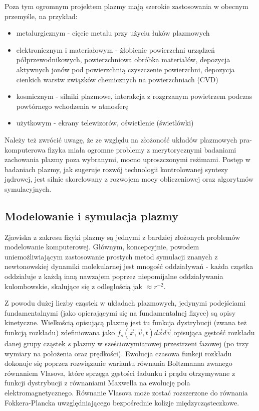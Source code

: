     Poza tym ogromnym projektem plazmy mają szerokie zastosowania w obecnym przemyśle, na przykład:
    \begin{itemize}
        \item metalurgicznym - cięcie metalu przy użyciu łuków plazmowych
        \item elektronicznym i materiałowym - żłobienie powierzchni urządzeń
            półprzewodnikowych, powierzchniowa obróbka materiałów, depozycja
            aktywnych jonów pod powierzchnią czyszczenie powierzchni, depozycja
            cienkich warstw związków chemicznych na powierzchniach (CVD)
        \item kosmicznym - silniki plazmowe, interakcja z rozgrzanym powietrzem podczas powtórnego wchodzenia
            w atmosferę 
        \item użytkowym - ekrany telewizorów, oświetlenie (świetlówki)
    \end{itemize}

    Należy też zwrócić uwagę, że ze względu na złożoność układów plazmowych
    pra-komputerowa fizyka miała ogromne problemy z merytorycznymi badaniami
    zachowania plazmy poza wybranymi, mocno uproszczonymi reżimami. Postęp w
    badaniach plazmy, jak sugeruje rozwój technologii kontrolowanej syntezy
    jądrowej, jest silnie skorelowany  z
    rozwojem mocy obliczeniowej oraz algorytmów symulacyjnych.

    \subsection{Modelowanie i symulacja plazmy}

    Zjawiska z zakresu fizyki plazmy są jednymi z bardziej złożonych problemów modelowanie komputerowej.
    Głównym, koncepcyjnie, powodem uniemożliwiającym zastosowanie prostych metod symulacji
    znanych z newtonowskiej dynamiki molekularnej jest mnogość oddziaływań - każda cząstka oddziałuje
    z każdą inną nawzajem poprzez niepomijalne oddziaływania kulombowskie, skalujące się z odległością jak
    $\approx r^{-2}$.

    Z powodu dużej liczby cząstek w układach plazmowych, jedynymi podejściami
    fundamentalnymi (jako opierającymi się na fundamentalnej fizyce) są opisy
    kinetyczne. Wielkością opisującą plazmę jest tu funkcja dystrybucji (zwana
    też funkcją rozkładu) zdefiniowana jako $f_s(\vec{x}, \vec{v}, t) d\vec{x}
    d\vec{v}$ opisująca gęstość rozkładu danej grupy cząstek $s$ plazmy w
    sześciowymiarowej przestrzeni fazowej (po trzy wymiary na położenia oraz
    prędkości). Ewolucja czasowa funkcji rozkładu dokonuje się poprzez
    rozwiązanie wariantu równania Boltzmanna zwanego równaniem Vlasova,
    które sprzęga gęstości ładunku i prądu otrzymywane z funkcji dystrybucji
    z równaniami Maxwella na ewolucję pola elektromagnetycznego. Równanie
    Vlasova może zostać rozszerzone do równania Fokkera-Plancka uwzględniającego
    bezpośrednie kolizje międzycząsteczkowe.



